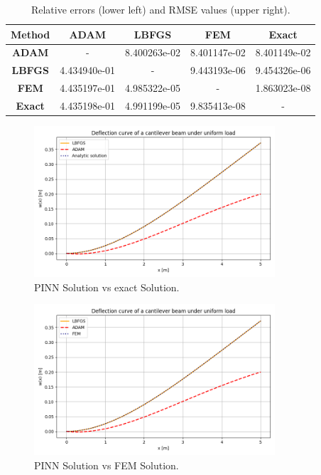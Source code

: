 \documentclass[a4paper,11pt]{article}
\begin{document}
\begin{table}[h!]
\centering
\begin{tabular}{ccccc}
\toprule
\textbf{Method} & \textbf{ADAM} & \textbf{LBFGS} & \textbf{FEM} & \textbf{Exact} \\
\midrule
\textbf{ADAM} & - & 8.400263e-02 & 8.401147e-02 & 8.401149e-02 \\
\textbf{LBFGS}  & 4.434940e-01 & -  & 9.443193e-06 & 9.454326e-06 \\
\textbf{FEM} & 4.435197e-01 & 4.985322e-05 & - & 1.863023e-08 \\
\textbf{Exact} & 4.435198e-01 & 4.991199e-05 & 9.835413e-08 & - \\
\bottomrule
\end{tabular}
\caption{Relative errors (lower left) and RMSE values (upper right).}
\label{ComparisonFwdProblem}
\end{table}

\begin{figure}[H]
    \centering
    \includegraphics[width=0.8\textwidth]{Charts/Exact_Solution.png}
    \caption{PINN Solution vs exact Solution.}
    \label{fig:example}
\end{figure}

\begin{figure}[H]
    \centering
    \includegraphics[width=0.8\textwidth]{Charts/FEM_Solution.png}
    \caption{PINN Solution vs FEM Solution.}
    \label{fig:example}
\end{figure}
\end{document}

